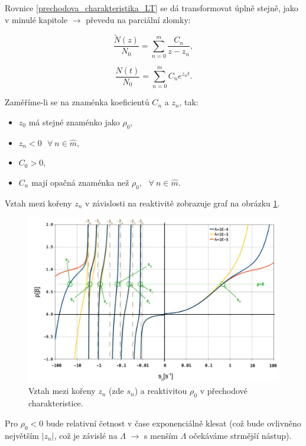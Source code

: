 Rovnice \eqref{prechodova_charakteristika_LT} se dá transformovat úplně stejně, jako v minulé kapitole $\rightarrow$ převedu na parciální zlomky:

$$ \dfrac{\tilde{N}(z)}{N_0} = \sum_{n=0}^m \dfrac{C_n}{z-z_n}, $$

\begin{equation}
  \boxed{
  \dfrac{N(t)}{N_0} = \sum_{n=0}^m C_n e^{z_n t}.
  \label{prechodova_charakteristika}}
\end{equation}

Zaměříme-li se na znaménka koeficientů $C_n$ a $z_n$, tak:

\begin{itemize}
  \item $z_0$ má stejné znaménko jako $\rho_0$,
  \item $z_n < 0 \: \: \: \forall \: n \in \widehat{m}$,
  \item $C_0 > 0$,
  \item $C_n$ mají opačná znaménka než $\rho_0, \: \: \: \forall \: n \in \widehat{m}$.
\end{itemize}

Vztah mezi kořeny $z_n$ v závislosti na reaktivitě zobrazuje graf na obrázku \ref{fig_zn-rho}.

\begin{figure}[H]
  \centering
  \includegraphics[width=1\textwidth]{img/zn-rho.jpg}
  \caption{Vztah mezi kořeny $z_n$ (zde $s_n$) a reaktivitou $\rho_0$ v přechodové charakteristice.}
  \label{fig_zn-rho}
\end{figure}

Pro $\rho_0 < 0$ bude relativní četnost v čase exponenciálně klesat (což bude ovlivněno největším $|z_n|$, což je závislé na $\Lambda$ $\rightarrow$ s menším $\Lambda$ očekáváme strmější nástup).\\

